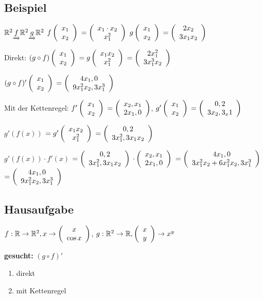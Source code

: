 \subsection{Beispiel}
$\R^2 \underrightarrow{f} \R^2 \underrightarrow{g} \R^2$
$f\vektor{x_1\\x_2}$
$=\vektor{x_1 \cdot x_2\\ x_1^2}$
$g\vektor{x_1\\ x_2}$
$=\vektor{2 x_2\\ 3 x_1 x_2}$

Direkt:
$(g\circ f)\vektor{x_1 \\ x_2}$
$= g\vektor{x_1 x_2 \\ x_1^2}$
$= \vektor{2 x_1^2\\ 3 x_1^3 x_2}$

$(g\circ f)'\vektor{x_1 \\ x_2}$
$= \vektor{4 x_1, 0\\ 9 x_1^2 x_2, 3 x_1^3}$

Mit der Kettenregel: 
$f'\vektor{x_1 \\ x_2} $
$=\vektor{x_2, x_1\\ 2 x_1, 0}$,
$g'\vektor{x_1 \\ x_2}$
$=\vektor{0, 2\\3 x_2, 3_x1}$

$g'(f(x)) $
$= g' \vektor{x_1 x_2 \\ x_1^2}$
$= \vektor{0, 2 \\ 3 x_1^2, 3 x_1 x_2}$

$g'(f(x)) \cdot f'(x) $
$=\vektor{0, 2 \\ 3 x_1^2, 3 x_1 x_2}$
$\cdot \vektor{x_2, x_1 \\ 2 x_1, 0}$
$= \vektor{4 x_1, 0 \\ 3 x_1^2 x_2 + 6 x_1^2 x_2, 3 x_1^3}$
$=\vektor{4 x_1, 0 \\ 9 x_1^2 x_2, 3 x_1^3}$

\subsection{Hausaufgabe}
$ f: \R \rightarrow \R^2, x \rightarrow \vektor{x \\ \cos x}$, 
$ g: \R^2 \rightarrow \R, \vektor{x\\y}\rightarrow x^y$

\textbf{gesucht:} $(g\circ f)'$
\begin{enumerate}
\item direkt
\item mit Kettenregel
\end{enumerate}
